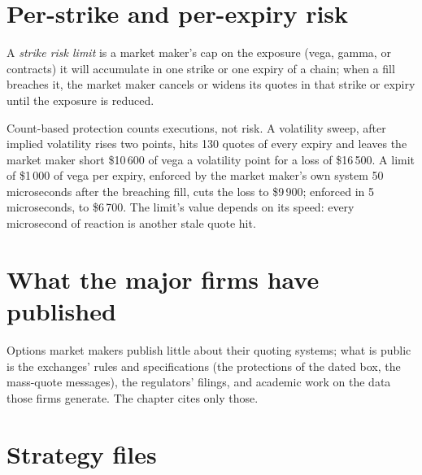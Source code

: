\section{Per-strike and per-expiry risk}

\begin{definition}\label{def:hf:automated-options-market-making:strike}
A \emph{strike risk limit} is a market maker's cap on the exposure (vega, gamma, or contracts) it will accumulate in one
strike or one expiry of a chain; when a fill breaches it, the market maker cancels or widens its quotes in that strike or expiry until the
exposure is reduced.
\end{definition}

Count-based protection counts executions, not risk. A volatility sweep, after implied volatility rises two points, hits 130 quotes of every
expiry and leaves the market maker short \$10\,600 of vega a volatility point for a loss of \$16\,500. A limit of \$1\,000 of vega per expiry,
enforced by the market maker's own system 50 microseconds after the breaching fill, cuts the loss to \$9\,900; enforced in 5 microseconds, to
\$6\,700. The limit's value depends on its speed: every microsecond of reaction is another stale quote hit.

\section{What the major firms have published}

Options market makers publish little about their quoting systems; what is public is the exchanges' rules and specifications (the protections of the
dated box, the mass-quote messages), the regulators' filings, and academic work on the data those firms generate. The chapter cites only those.

\section{Strategy files}

